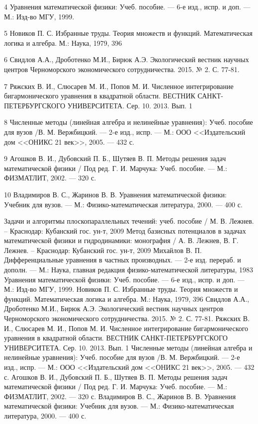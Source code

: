 \documentclass[a4paper]{article}
\begin{document}
4 Уравнения математической физики: Учеб. пособие. --- 6-е изд., испр. и доп. --- М.: Изд-во МГУ, 1999.

5 Новиков П. С. Избранные труды. Теория множеств и функций. Математическая логика и алгебра. М.: Наука, 1979, 396

6 Свидлов А.А., Дроботенко М.И., Бирюк А.Э.
Экологический вестник научных центров Черноморского экономического сотрудничества. 2015. № 2. С. 77-81.

7 Ряжских В. И., Слюсарев М. И., Попов М. И. Численное интегрирование бигармонического уравнения в квадратной области. ВЕСТНИК САНКТ-ПЕТЕРБУРГСКОГО УНИВЕРСИТЕТА. Сер. 10. 2013. Вып. 1

8 Численные методы (линейная алгебра и нелинейные уравнения): Учеб. пособие для вузов /В. М. Вержбицкий. --- 2-е изд., испр. --- М.: ООО <<Издательский дом <<ОНИКС 21 век>>, 2005. --- 432 с.

9 Агошков В. И., Дубовский П. Б., Шутяев В. П. Методы решения задач математической физики / Под ред. Г. И. Марчука: Учеб. пособие. --- М.: ФИЗМАТЛИТ, 2002. --- 320 с.

10 Владимиров В. С., Жаринов В. В. Уравнения математической физики: Учебник для вузов. --- М.: Физико-математическая литература, 2000. --- 400 с.

\newpage
\begin{thebibliography}{15}
  Задачи и алгоритмы плоскопараллельных течений: учеб. пособие / М. В. Лежнев. -- Краснодар: Кубанский гос. ун-т, 2009
  Метод базисных потенциалов в задачах математической физики и гидродинамики: монография / А. В. Лежнев, В. Г. Лежнев. -- Краснодар: Кубанский гос. ун-т, 2009
  Михайлов В. П. Дифференциальные уравнения в частных производных. --- 2-е изд. перераб. и дополн. --- М.: Наука, главная редакция физико-математической литературы, 1983
  Уравнения математической физики: Учеб. пособие. --- 6-е изд., испр. и доп. --- М.: Изд-во МГУ, 1999.
  Новиков П. С. Избранные труды. Теория множеств и функций. Математическая логика и алгебра. М.: Наука, 1979, 396
  Свидлов А.А., Дроботенко М.И., Бирюк А.Э.
  Экологический вестник научных центров Черноморского экономического сотрудничества. 2015. № 2. С. 77-81.
  Ряжских В. И., Слюсарев М. И., Попов М. И. Численное интегрирование бигармонического уравнения в квадратной области. ВЕСТНИК САНКТ-ПЕТЕРБУРГСКОГО УНИВЕРСИТЕТА. Сер. 10. 2013. Вып. 1
  Численные методы (линейная алгебра и нелинейные уравнения): Учеб. пособие для вузов /В. М. Вержбицкий. --- 2-е изд., испр. --- М.: ООО <<Издательский дом <<ОНИКС 21 век>>, 2005. --- 432 с.
  Агошков В. И., Дубовский П. Б., Шутяев В. П. Методы решения задач математической физики / Под ред. Г. И. Марчука: Учеб. пособие. --- М.: ФИЗМАТЛИТ, 2002. --- 320 с.
  Владимиров В. С., Жаринов В. В. Уравнения математической физики: Учебник для вузов. --- М.: Физико-математическая литература, 2000. --- 400 с.


\end{thebibliography}
\end{document}
